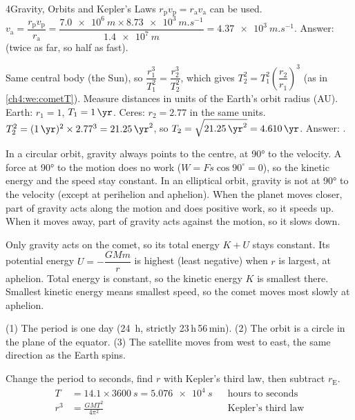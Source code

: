 \begin{chapteranswers}{4}{Gravity, Orbits and Kepler's Laws}
        $r_\mathrm{p} v_\mathrm{p} = r_\mathrm{a} v_\mathrm{a}$ can be used.
        $v_\mathrm{a} = \dfrac{r_\mathrm{p} v_\mathrm{p}}{r_\mathrm{a}}
        = \dfrac{\qty{7.0e6}{m} \times \qty{8.73e3}{m.s^{-1}}}{\qty{1.4e7}{m}} = \qty{4.37e3}{m.s^{-1}}$.
        Answer:  (twice as far, so half as fast).
  \item Same central body (the Sun), so $\dfrac{r_1^3}{T_1^2} = \dfrac{r_2^3}{T_2^2}$, which
        gives $T_2^2 = T_1^2 \left(\dfrac{r_2}{r_1}\right)^3$ (as in \cref{ch4:we:cometT}).
        Measure distances in units of the Earth's orbit radius (AU). Earth: $r_1 = 1$,
        $T_1 = \qty{1}{\yr}$. Ceres: $r_2 = 2.77$ in the same units.
        $T_2^2 = (\qty{1}{\yr})^2 \times 2.77^3 = \qty{21.25}{\yr^2}$, so
        $T_2 = \sqrt{\qty{21.25}{\yr^2}} = \qty{4.610}{\yr}$.
        Answer: .
  \item In a circular orbit, gravity always points to the centre, at \ang{90} to the velocity.
        A force at \ang{90} to the motion does no work ($W = Fs\cos 90^\circ = 0$), so the
        kinetic energy and the speed stay constant. In an elliptical orbit, gravity is not at
        \ang{90} to the velocity (except at perihelion and aphelion). When the planet moves
        closer, part of gravity acts along the motion and does positive work, so it speeds up.
        When it moves away, part of gravity acts against the motion, so it slows down.
  \item Only gravity acts on the comet, so its total energy $K + U$ stays constant. Its
        potential energy $U = -\dfrac{GMm}{r}$ is highest (least negative) when $r$ is largest,
        at aphelion. Total energy is constant, so the kinetic energy $K$ is smallest there.
        Smallest kinetic energy means smallest speed, so the comet moves most slowly at aphelion.
  \item (1) The period is one day (\qty{24}{h}, strictly 23\,h\,56\,min). (2) The orbit is a
        circle in the plane of the equator. (3) The satellite moves from west to east, the same
        direction as the Earth spins.
  \item Change the period to seconds, find $r$ with Kepler's third law, then subtract $r_\mathrm{E}$.
        \begin{align*}
          T &= 14.1 \times \qty{3600}{s} = \qty{5.076e4}{s} && \text{hours to seconds}\\
          r^3 &= \frac{GMT^2}{4\pi^2} && \text{Kepler's third law}\\

\end{align*}
\end{chapteranswers}
